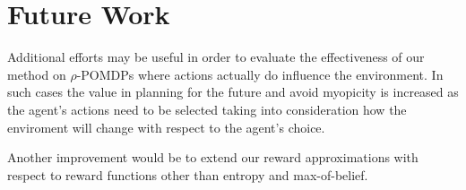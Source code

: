 \section{Future Work}

Additional efforts may be useful in order to evaluate the effectiveness of our method on
$\rho$-POMDPs where actions actually do influence the environment. In such cases the value in
planning for the future and avoid myopicity is increased as the agent's actions need to be selected
taking into consideration how the enviroment will change with respect to the agent's choice.

Another improvement would be to extend our reward approximations with respect to reward functions
other than entropy and max-of-belief.
